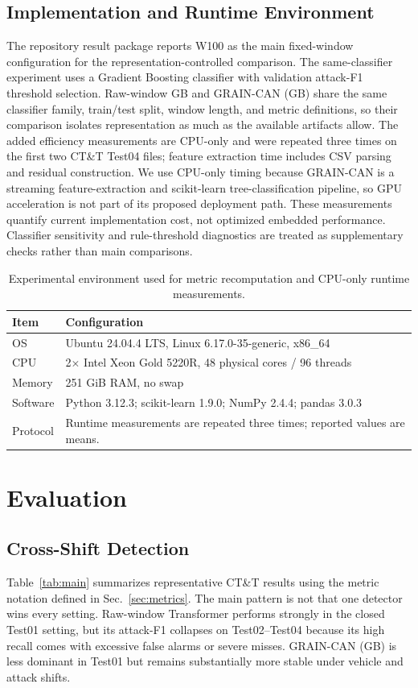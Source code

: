 \documentclass[runningheads]{llncs}
\newcommand{\method}{GRAIN-CAN}
\begin{document}
\subsection{Implementation and Runtime Environment}
The repository result package reports W100 as the main fixed-window configuration for the representation-controlled comparison. The same-classifier experiment uses a Gradient Boosting classifier with validation attack-F1 threshold selection. Raw-window GB and \method{} (GB) share the same classifier family, train/test split, window length, and metric definitions, so their comparison isolates representation as much as the available artifacts allow. The added efficiency measurements are CPU-only and were repeated three times on the first two CT\&T Test04 files; feature extraction time includes CSV parsing and residual construction. We use CPU-only timing because \method{} is a streaming feature-extraction and scikit-learn tree-classification pipeline, so GPU acceleration is not part of its proposed deployment path. These measurements quantify current implementation cost, not optimized embedded performance. Classifier sensitivity and rule-threshold diagnostics are treated as supplementary checks rather than main comparisons.

\begin{table}[H]
\centering
\caption{Experimental environment used for metric recomputation and CPU-only runtime measurements.}
\label{tab:environment}
\small
\setlength{\tabcolsep}{4pt}
\renewcommand{\arraystretch}{1.05}
\begin{tabularx}{\textwidth}{p{} X}
\toprule
Item & Configuration \\
\midrule
OS & Ubuntu 24.04.4 LTS, Linux 6.17.0-35-generic, x86\_64 \\
CPU & 2$\times$ Intel Xeon Gold 5220R, 48 physical cores / 96 threads \\
Memory & 251 GiB RAM, no swap \\
Software & Python 3.12.3; scikit-learn 1.9.0; NumPy 2.4.4; pandas 3.0.3 \\
Protocol & Runtime measurements are repeated three times; reported values are means. \\
\bottomrule
\end{tabularx}
\end{table}

\section{Evaluation}
\subsection{Cross-Shift Detection}
Table~\ref{tab:main} summarizes representative CT\&T results using the metric notation defined in Sec.~\ref{sec:metrics}. The main pattern is not that one detector wins every setting. Raw-window Transformer performs strongly in the closed Test01 setting, but its attack-F1 collapses on Test02--Test04 because its high recall comes with excessive false alarms or severe misses. \method{} (GB) is less dominant in Test01 but remains substantially more stable under vehicle and attack shifts.
\end{document}
